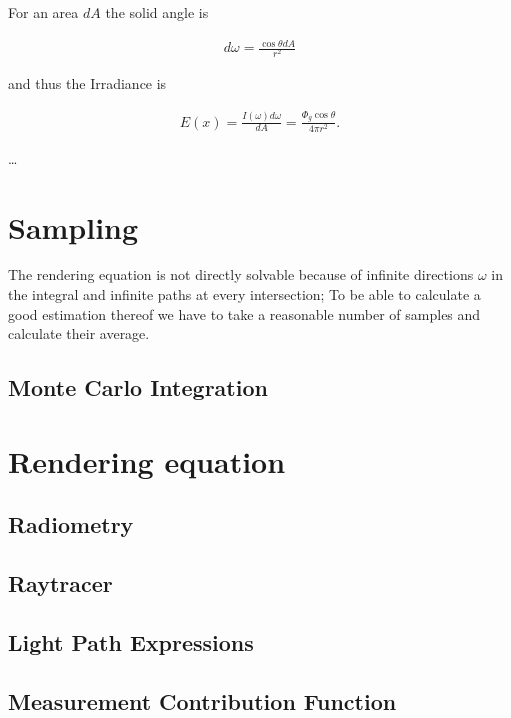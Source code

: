 For an area $dA$ the solid angle is 

\begin{align}
d\omega = \frac{\cos \theta dA}{r^2}  
\end{align}


and thus the Irradiance is

\begin{align}
E(x) = \frac{ I(\omega) d\omega }{ dA } = \frac{ \Phi_g \cos \theta }{ 4 \pi r^2}.
\end{align}

…

\section{Sampling}


The rendering equation is not directly solvable because of infinite directions $\omega$ in the integral and infinite paths at every intersection; To be able to calculate a good estimation thereof we have to take a reasonable number of samples and calculate their average.

\subsection{Monte Carlo Integration}
\label{sec:montecarlo}











\section{Rendering equation}
\subsection{Radiometry}
\subsection{Raytracer}
\subsection{Light Path Expressions}
\subsection{Measurement Contribution Function}


